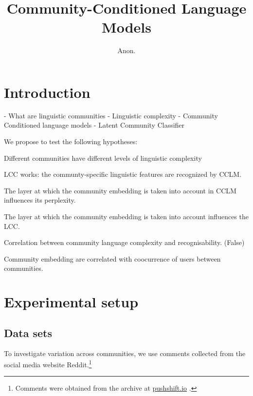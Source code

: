 \documentclass[11pt,a4paper]{article}
\title{Community-Conditioned Language Models}
\author{Anon.}
\date{}
\begin{document}
\maketitle
\begin{abstract}
\end{abstract}


\section{Introduction}

- What are linguistic communities
  - Linguistic complexity
- Community Conditioned language models
- Latent Community Classifier

We propose to test the following hypotheses:


\begin{hypotheses}
\item Different communities have different levels of linguistic
  complexity

\item LCC works: the communty-specific linguistic features are recognized by CCLM.
\item The layer at which the community embedding is taken into account
  in CCLM influences its perplexity.
\item The layer at which the community embedding is taken into account
  influences the LCC.
\item Correlation between community language complexity and recognisability. (False)
\item Community embedding are correlated with coocurrence of users
  between communities.
\end{hypotheses}

\section{Experimental setup}

\subsection{Data sets}

To investigate variation across communities, we use comments collected 
from the social media website Reddit.\footnote{Comments were obtained 
from the archive at \href{https://pushshift.io/}{pushshift.io} \cite{Baumgartner2020}.}
\end{document}
